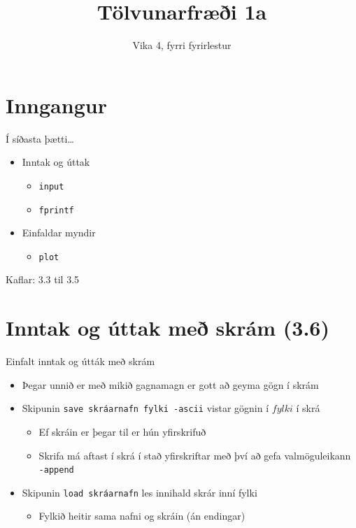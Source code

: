 \documentclass{beamer}
\title{Tölvunarfræði 1a}
\subtitle{Vika 4, fyrri fyrirlestur}
\begin{document}
\begin{frame}
\titlepage
\end{frame}

\section{Inngangur}


\begin{frame}{Í síðasta þætti\ldots}
\begin{itemize}
 \item Inntak og úttak
 \begin{itemize}
  \item \texttt{input}
  \item \texttt{fprintf}
 \end{itemize}
 \item Einfaldar myndir
 \begin{itemize}
  \item \texttt{plot}
 \end{itemize}
\end{itemize}
Kaflar: 3.3 til 3.5
\end{frame}

\section{Inntak og úttak með skrám (3.6)}

\begin{frame}{Einfalt inntak og útták með skrám}
\begin{itemize}
 \item Þegar unnið er með mikið gagnamagn er gott að geyma gögn í skrám
 \item Skipunin \texttt{save skráarnafn fylki -ascii} vistar gögnin í $fylki$ í skrá
 \begin{itemize}
  \item Ef skráin er þegar til er hún yfirskrifuð
  \item Skrifa má aftast í skrá í stað yfirskriftar með því að gefa valmöguleikann \texttt{-append}
 \end{itemize}
 \item Skipunin \texttt{load skráarnafn} les innihald skrár inní fylki
  \begin{itemize}
   \item Fylkið heitir sama nafni og skráin (án endingar)
  \end{itemize}
 \end{itemize}
\end{frame}
\end{document}
